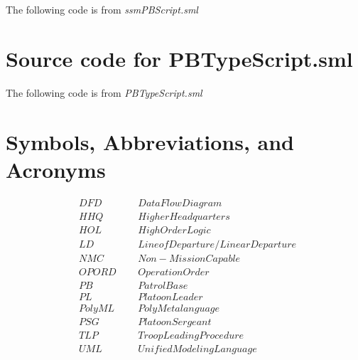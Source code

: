 The following code is from \emph{ssmPBScript.sml}


\chapter{Source code for PBTypeScript.sml}
\label{cha:source-code-pbtyp}

The following code is from \emph{PBTypeScript.sml}


\chapter{Symbols, Abbreviations, and Acronyms}
\label{cha:list-symb-abbr}

\begin{align*}
&DFD\;\;\;\;\;&Data Flow Diagram\ \\
&HHQ\;\;\;\;\;&Higher Headquarters\ \\ 
&HOL\;\;\;\;\;&High Order Logic\ \\
&LD\;\;\;\;\;&Line of Departure/Linear Departure\ \\
&NMC\;\;\;\;\;&Non-Mission Capable\ \\
&OPORD\;\;\;\;\;&Operation Order\ \\
&PB\;\;\;\;\;&Patrol Base\ \\
&PL\;\;\;\;\;&Platoon Leader\ \\
&PolyML\;\;\;\;\;&Poly Metalanguage\ \\
&PSG\;\;\;\;\;&Platoon Sergeant\ \\
&TLP\;\;\;\;\;&Troop Leading Procedure\ \\
&UML\;\;\;\;\;&Unified Modeling Language\ \\
\end{align*}